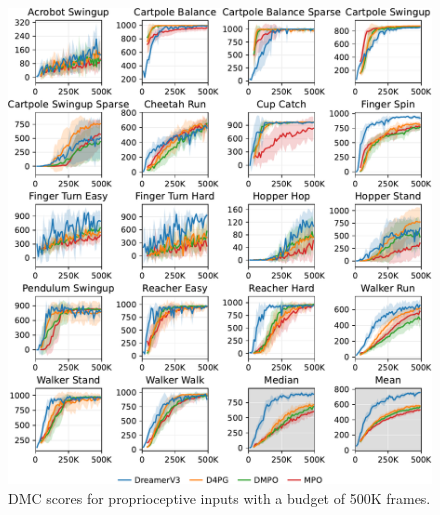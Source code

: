 \begin{figure}[h!]
\centering
\includegraphics[width=1\linewidth]{dmc_proprio/dmc_proprio}
\caption{DMC scores for proprioceptive inputs with a budget of 500K frames.}
\label{fig:dmc_proprio}
\end{figure}
